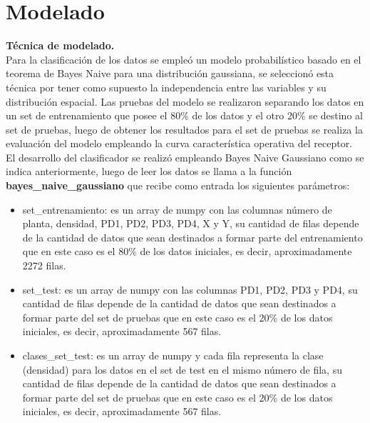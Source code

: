 \section{Modelado}

\noindent
\textbf{Técnica de modelado.}\\

Para la clasificación de los datos se empleó un modelo probabilístico basado en el teorema de Bayes Naive para una distribución
gaussiana, se seleccionó esta técnica por tener como supuesto la independencia entre las variables y su distribución
espacial. Las pruebas del modelo se realizaron separando los datos en un set de entrenamiento que posee el 80\% de los
datos y el otro 20\% se destino al set de pruebas, luego de obtener los resultados para el set de pruebas se realiza la
evaluación del modelo empleando la curva característica operativa del receptor.\\

El desarrollo del clasificador se realizó empleando Bayes Naive Gaussiano como se indica anteriormente, luego de leer los datos se llama a la función
\textbf{bayes\_naive\_gaussiano} que recibe como entrada los siguientes parámetros:
\begin{itemize}
	\item{set\_entrenamiento: es un array de numpy con las columnas número de planta, densidad, PD1, PD2, PD3, PD4, X y Y, su
	cantidad de filas depende de la cantidad de datos que sean destinados a formar parte del entrenamiento que en este caso es
	el 80\% de los datos iniciales, es decir, aproximadamente 2272 filas.}
	\item{set\_test: es un array de numpy con las columnas PD1, PD2, PD3 y PD4, su cantidad de filas depende de la cantidad de
	datos que sean destinados a formar parte del set de pruebas que en este caso es el 20\% de los datos iniciales, es decir,
	aproximadamente 567 filas.}
	\item{clases\_set\_test: es un array de numpy y cada fila representa la clase (densidad) para los datos en el set de test
	en el mismo número de fila, su cantidad de filas depende de la cantidad de datos que sean destinados a formar parte del set
	de pruebas que en este caso es el 20\% de los datos iniciales, es decir, aproximadamente 567 filas.}
\end{itemize}

